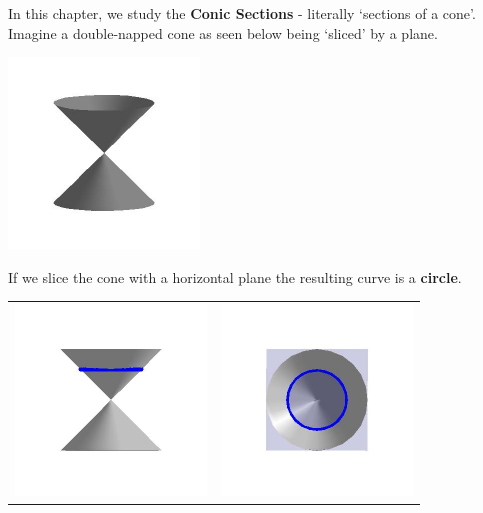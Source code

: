 

\setcounter{footnote}{0}

\label{IntrotoConics}

In this chapter, we study the  \textbf{Conic Sections} - literally `sections of a  cone'.  Imagine a double-napped cone as seen below being `sliced' by a plane. 

\centerline{\includegraphics[width=2in]{./IntrotoConicsGraphics/cone.jpg}}

If we slice the cone with a horizontal plane the resulting curve is a  \textbf{circle}.

\begin{center}

\begin{tabular}{cc}

\includegraphics[width=2in]{./IntrotoConicsGraphics/Circle01.jpg} & \includegraphics[width=2in]{./IntrotoConicsGraphics/Circle02.jpg} \\

\end{tabular}

\end{center}

